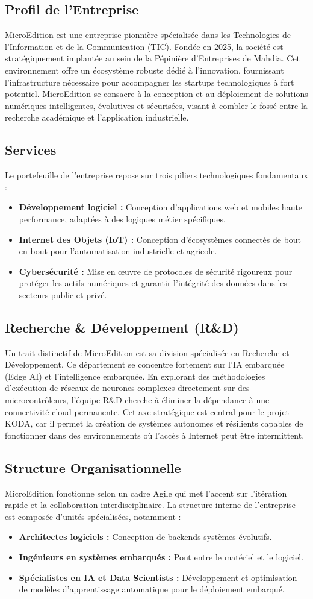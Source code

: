 \documentclass[a4paper,12pt]{report}
\newcommand{\subsectiontitle}[1]{\needspace{3\baselineskip}\subsection{#1}}
\begin{document}
	\subsectiontitle{Profil de l'Entreprise}
	
	MicroEdition est une entreprise pionnière spécialisée dans les Technologies de l'Information et de la Communication (TIC). Fondée en 2025, la société est stratégiquement implantée au sein de la Pépinière d'Entreprises de Mahdia. Cet environnement offre un écosystème robuste dédié à l'innovation, fournissant l'infrastructure nécessaire pour accompagner les startups technologiques à fort potentiel. MicroEdition se consacre à la conception et au déploiement de solutions numériques intelligentes, évolutives et sécurisées, visant à combler le fossé entre la recherche académique et l'application industrielle.
	
	\subsectiontitle{Services}
	
	Le portefeuille de l'entreprise repose sur trois piliers technologiques fondamentaux :
	\begin{itemize}
		\item \textbf{Développement logiciel :} Conception d'applications web et mobiles haute performance, adaptées à des logiques métier spécifiques.
		\item \textbf{Internet des Objets (IoT) :} Conception d'écosystèmes connectés de bout en bout pour l'automatisation industrielle et agricole.
		\item \textbf{Cybersécurité :} Mise en œuvre de protocoles de sécurité rigoureux pour protéger les actifs numériques et garantir l'intégrité des données dans les secteurs public et privé.
	\end{itemize}
	
	\subsectiontitle{Recherche \& Développement (R\&D)}
	
	Un trait distinctif de MicroEdition est sa division spécialisée en Recherche et Développement. Ce département se concentre fortement sur l'IA embarquée (Edge AI) et l'intelligence embarquée. En explorant des méthodologies d'exécution de réseaux de neurones complexes directement sur des microcontrôleurs, l'équipe R\&D cherche à éliminer la dépendance à une connectivité cloud permanente. Cet axe stratégique est central pour le projet KODA, car il permet la création de systèmes autonomes et résilients capables de fonctionner dans des environnements où l'accès à Internet peut être intermittent.
	
	\subsectiontitle{Structure Organisationnelle}
	
	MicroEdition fonctionne selon un cadre Agile qui met l'accent sur l'itération rapide et la collaboration interdisciplinaire. La structure interne de l'entreprise est composée d'unités spécialisées, notamment :
	\begin{itemize}
		\item \textbf{Architectes logiciels :} Conception de backends systèmes évolutifs.
		\item \textbf{Ingénieurs en systèmes embarqués :} Pont entre le matériel et le logiciel.
		\item \textbf{Spécialistes en IA et Data Scientists :} Développement et optimisation de modèles d'apprentissage automatique pour le déploiement embarqué.
	\end{itemize}
	
\end{document}
